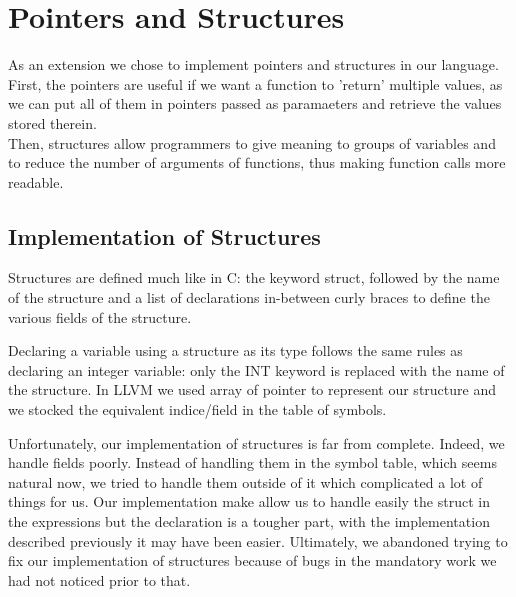 \documentclass{article}
\begin{document}
\section{Pointers and Structures}
As an extension we chose to implement pointers and structures in our language. First, the pointers are useful
if we want a function to 'return' multiple values, as we can put all of them in pointers passed as paramaeters and retrieve the values stored therein.\\
Then, structures allow programmers to give meaning to groups of variables and to reduce the number of arguments of functions, thus making function calls more readable. 

\subsection{Implementation of Structures}

Structures are defined much like in C: the keyword struct, followed by the name of the structure and a list of declarations in-between curly braces to define the various fields of the structure.

Declaring a variable using a structure as its type follows the same rules as declaring an integer variable: only the INT keyword is replaced with the name of the structure.
In LLVM we used array of pointer to represent our structure and we stocked the equivalent indice/field in the table of symbols. 

Unfortunately, our implementation of structures is far from complete. Indeed, we handle fields poorly. Instead of handling them in the symbol table, which seems natural now, we tried to handle them outside of it which complicated a lot of things for us. Our implementation make allow us to handle easily the struct in the expressions but the declaration is a tougher part, with the implementation described previously it may have been easier. Ultimately, we abandoned trying to fix our implementation of structures because of bugs in the mandatory work we had not noticed prior to that.
\end{document}

